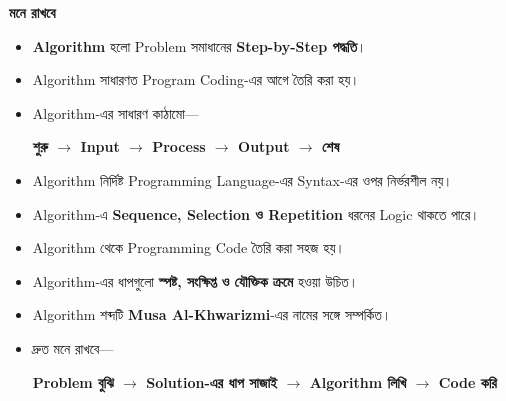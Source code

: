 \begin{rememberbox}

\textbf{\color{deepOrange}মনে রাখবে}

\begin{itemize}

\item \textbf{Algorithm} হলো Problem সমাধানের
\textbf{Step-by-Step পদ্ধতি}।

\item Algorithm সাধারণত Program Coding-এর আগে তৈরি করা হয়।

\item Algorithm-এর সাধারণ কাঠামো—

\begin{center}

\textbf{
শুরু
\(\rightarrow\)
Input
\(\rightarrow\)
Process
\(\rightarrow\)
Output
\(\rightarrow\)
শেষ
}

\end{center}

\item Algorithm নির্দিষ্ট Programming Language-এর
Syntax-এর ওপর নির্ভরশীল নয়।

\item Algorithm-এ
\textbf{Sequence, Selection ও Repetition}
ধরনের Logic থাকতে পারে।

\item Algorithm থেকে Programming Code তৈরি করা সহজ হয়।

\item Algorithm-এর ধাপগুলো
\textbf{স্পষ্ট, সংক্ষিপ্ত ও যৌক্তিক ক্রমে} হওয়া উচিত।

\item Algorithm শব্দটি
\textbf{Musa Al-Khwarizmi}-এর নামের সঙ্গে সম্পর্কিত।

\item দ্রুত মনে রাখবে—

\begin{center}

\textbf{
Problem বুঝি
\(\longrightarrow\)
Solution-এর ধাপ সাজাই
\(\longrightarrow\)
Algorithm লিখি
\(\longrightarrow\)
Code করি
}

\end{center}

\end{itemize}

\end{rememberbox}

\small


